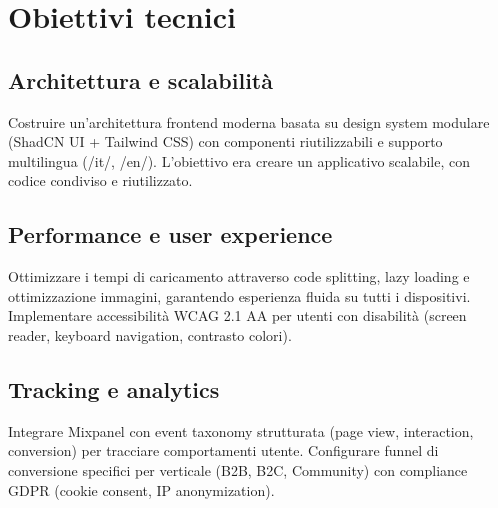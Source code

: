 \section{Obiettivi tecnici}

\subsection{Architettura e scalabilità}
Costruire un'architettura frontend moderna basata su design system modulare (ShadCN UI + Tailwind CSS) con componenti riutilizzabili e supporto multilingua (/it/, /en/). L'obiettivo era creare un applicativo scalabile, con codice condiviso e riutilizzato.

\subsection{Performance e user experience}
Ottimizzare i tempi di caricamento attraverso code splitting, lazy loading e ottimizzazione immagini, garantendo esperienza fluida su tutti i dispositivi. Implementare accessibilità WCAG 2.1 AA per utenti con disabilità (screen reader, keyboard navigation, contrasto colori).

\subsection{Tracking e analytics}
Integrare Mixpanel con event taxonomy strutturata (page view, interaction, conversion) per tracciare comportamenti utente. Configurare funnel di conversione specifici per verticale (B2B, B2C, Community) con compliance GDPR (cookie consent, IP anonymization).